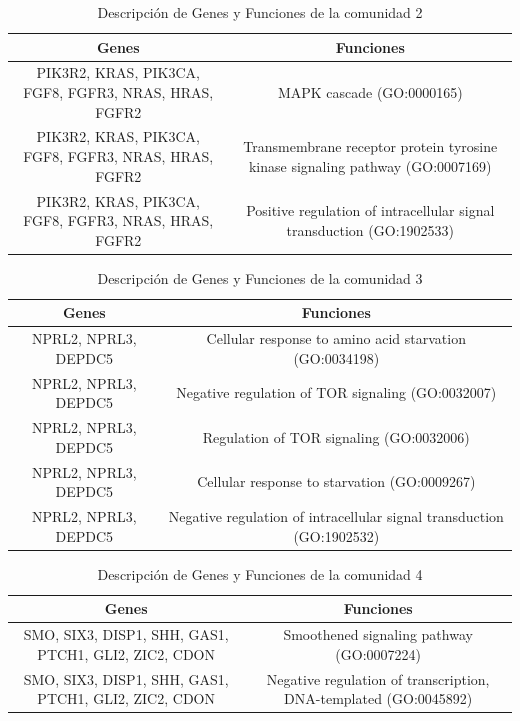 \begin{table}[!]
    \label{tabla:genes_funciones2}
 	\caption{Descripción de Genes y Funciones de la comunidad 2}
	\centering
	\begin{tabular}{|C|C|}
    \toprule
    \textbf{Genes} & \textbf{Funciones} \\
    \midrule
    PIK3R2, KRAS, PIK3CA, FGF8, FGFR3, NRAS, HRAS, FGFR2 & MAPK cascade (GO:0000165) \\
    PIK3R2, KRAS, PIK3CA, FGF8, FGFR3, NRAS, HRAS, FGFR2 & Transmembrane receptor protein tyrosine kinase signaling pathway (GO:0007169) \\
    PIK3R2, KRAS, PIK3CA, FGF8, FGFR3, NRAS, HRAS, FGFR2 & Positive regulation of intracellular signal transduction (GO:1902533) \\
    \bottomrule
 	\end{tabular}
\end{table}



\begin{table}[!]
    \label{tabla:genes_funciones3}
 	\caption{Descripción de Genes y Funciones de la comunidad 3}
	\centering
	\begin{tabular}{|C|C|}
    \toprule
    \textbf{Genes} & \textbf{Funciones} \\
    \midrule
    NPRL2, NPRL3, DEPDC5 & Cellular response to amino acid starvation (GO:0034198) \\
    NPRL2, NPRL3, DEPDC5 & Negative regulation of TOR signaling (GO:0032007) \\
    NPRL2, NPRL3, DEPDC5 & Regulation of TOR signaling (GO:0032006) \\
    NPRL2, NPRL3, DEPDC5 & Cellular response to starvation (GO:0009267) \\
    NPRL2, NPRL3, DEPDC5 & Negative regulation of intracellular signal transduction (GO:1902532) \\
    \bottomrule
 	\end{tabular}
\end{table}

\begin{table}[!]
    \label{tabla:genes_funciones4}
 	\caption{Descripción de Genes y Funciones de la comunidad 4}
	\centering
	\begin{tabular}{|C|C|}
    \toprule
    \textbf{Genes} & \textbf{Funciones} \\
    \midrule
    SMO, SIX3, DISP1, SHH, GAS1, PTCH1, GLI2, ZIC2, CDON & Smoothened signaling pathway (GO:0007224) \\
    SMO, SIX3, DISP1, SHH, GAS1, PTCH1, GLI2, ZIC2, CDON & Negative regulation of transcription, DNA-templated (GO:0045892) \\
    \bottomrule
 	\end{tabular}
\end{table}



